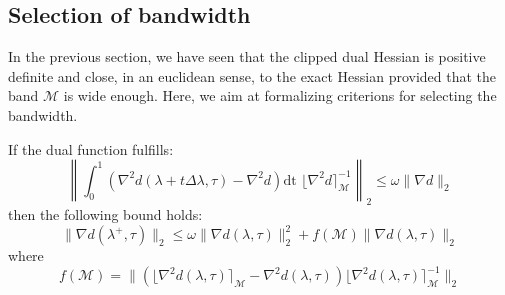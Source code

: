 \subsection{Selection of bandwidth}

In the previous section, we have seen that the clipped dual Hessian is positive definite and close, in an euclidean sense, to the exact Hessian provided that the band $\mathcal{M}$ is wide enough. Here, we aim at formalizing criterions for selecting the bandwidth.

\begin{theorem} If the dual function fulfills:
\begin{equation} \label{e:ConditionHessian}
\left\| \int_0^1 ( \nabla^2 d(\lambda + t \Delta \lambda, \tau) - \nabla^2 d ) \text{dt } \lfloor \nabla^2 d \rceil_{\mathcal{M}}^{-1} \right\|_2 \leq \omega \| \nabla d \|_2
\end{equation}
then the following bound holds:
\begin{equation} \label{e:Convergence}
\| \nabla d(\lambda^+,\tau) \|_2 \leq \omega \| \nabla d(\lambda, \tau) \|_2^2 + f(\mathcal{M}) \| \nabla d(\lambda, \tau) \|_2
\end{equation}
where
\begin{equation}
f(\mathcal{M}) = \| (\lfloor \nabla^2 d(\lambda, \tau) \rceil_{\mathcal{M}} - \nabla^2 d(\lambda,\tau) ) \lfloor \nabla^2 d(\lambda, \tau) \rceil_{\mathcal{M}}^{-1} \|_2
\end{equation}
\end{theorem}
